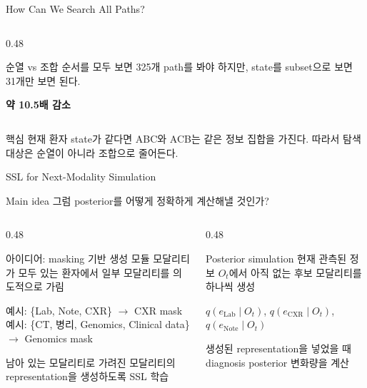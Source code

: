 \documentclass[
11pt,notheorems,hyperref={pdfauthor=whatever}
]{beamer}
\begin{document}
\begin{frame}{How Can We Search All Paths?}
\begin{columns}[T,onlytextwidth]
\begin{column}{0.48\textwidth}
\begin{alertblock}{순열 vs 조합}
\vspace{0.3em}
순서를 모두 보면 325개 path를 봐야 하지만, state를 subset으로 보면 31개만 보면 된다.

\vspace{0.2em}
\textbf{약 10.5배 감소}
\end{alertblock}
\end{column}
\end{columns}

\vspace{0.4em}
\begin{block}{핵심}
\scriptsize
현재 환자 state가 같다면 ABC와 ACB는 같은 정보 집합을 가진다. 따라서 탐색 대상은 순열이 아니라 조합으로 줄어든다.
\end{block}
\end{frame}

\begin{frame}{SSL for Next-Modality Simulation}
\vspace{0.1em}
\begin{alertblock}{Main idea}
\small
그럼 posterior를 어떻게 정확하게 계산해낼 것인가?
\end{alertblock}

\vspace{0.25em}
\begin{columns}[T,onlytextwidth]
\begin{column}{0.48\textwidth}
\begin{block}{아이디어: masking 기반 생성 모듈}
\scriptsize
모달리티가 모두 있는 환자에서 일부 모달리티를 의도적으로 가림

\vspace{0.35em}
예시: \{Lab, Note, CXR\} $\rightarrow$ CXR mask\\
예시: \{CT, 병리, Genomics, Clinical data\} $\rightarrow$ Genomics mask

\vspace{0.45em}
남아 있는 모달리티로 가려진 모달리티의 representation을 생성하도록 SSL 학습
\end{block}
\end{column}
\begin{column}{0.48\textwidth}
\begin{block}{Posterior simulation}
\scriptsize
현재 관측된 정보 $O_t$에서 아직 없는 후보 모달리티를 하나씩 생성

\vspace{0.35em}
$q(e_{\mathrm{Lab}}\mid O_t)$, 
$q(e_{\mathrm{CXR}}\mid O_t)$, 
$q(e_{\mathrm{Note}}\mid O_t)$

\vspace{0.45em}
생성된 representation을 넣었을 때 diagnosis posterior 변화량을 계산
\end{block}
\end{column}
\end{columns}


\end{frame}
\end{document}
